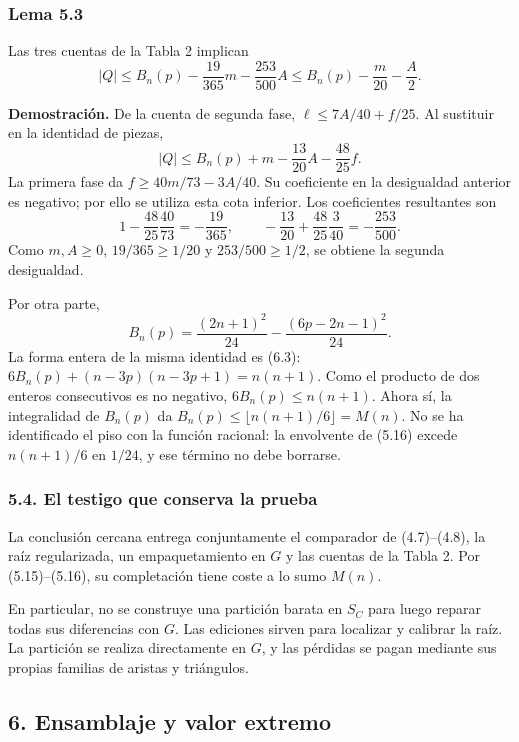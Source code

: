 \documentclass[spanish,11pt,a4paper]{article}
\begin{document}
\subsubsection{Lema 5.3}\label{lema-5.3}

Las tres cuentas de la Tabla 2 implican \[
|Q|\le B_n(p)-\frac{19}{365}m-\frac{253}{500}A
\le B_n(p)-\frac m{20}-\frac A2.
\tag{5.15}
\]

\textbf{Demostración.} De la cuenta de segunda fase, \(\ell\le7A/40+f/25\). Al sustituir en la identidad de piezas, \[
|Q|\le B_n(p)+m-\frac{13}{20}A-\frac{48}{25}f.
\] La primera fase da \(f\ge40m/73-3A/40\). Su coeficiente en la desigualdad anterior es negativo; por ello se utiliza esta cota inferior. Los coeficientes resultantes son \[
1-\frac{48}{25}\frac{40}{73}=-\frac{19}{365},\qquad
-\frac{13}{20}+\frac{48}{25}\frac3{40}=-\frac{253}{500}.
\] Como \(m,A\ge0\), \(19/365\ge1/20\) y \(253/500\ge1/2\), se obtiene la segunda desigualdad.

Por otra parte, \[
B_n(p)=\frac{(2n+1)^2}{24}-\frac{(6p-2n-1)^2}{24}.
\tag{5.16}
\] La forma entera de la misma identidad es (6.3): \(6B_n(p)+(n-3p)(n-3p+1)=n(n+1)\). Como el producto de dos enteros consecutivos es no negativo, \(6B_n(p)\le n(n+1)\). Ahora sí, la integralidad de \(B_n(p)\) da \(B_n(p)\le\lfloor n(n+1)/6\rfloor=M(n)\). No se ha identificado el piso con la función racional: la envolvente de (5.16) excede \(n(n+1)/6\) en \(1/24\), y ese término no debe borrarse.

\subsubsection{5.4. El testigo que conserva la prueba}\label{el-testigo-que-conserva-la-prueba}

La conclusión cercana entrega conjuntamente el comparador de (4.7)--(4.8), la raíz regularizada, un empaquetamiento en \(G\) y las cuentas de la Tabla 2. Por (5.15)--(5.16), su completación tiene coste a lo sumo \(M(n)\).

En particular, no se construye una partición barata en \(S_C\) para luego reparar todas sus diferencias con \(G\). Las ediciones sirven para localizar y calibrar la raíz. La partición se realiza directamente en \(G\), y las pérdidas se pagan mediante sus propias familias de aristas y triángulos.

\subsection{6. Ensamblaje y valor extremo}\label{ensamblaje-y-valor-extremo}
\end{document}
